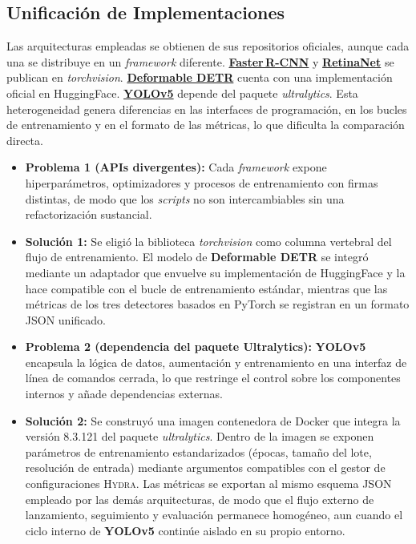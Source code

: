 \subsection{Unificación de Implementaciones}\label{ssec:unify_impl}

Las arquitecturas empleadas se obtienen de sus repositorios oficiales, aunque cada una se distribuye en un \emph{framework} diferente.
\href{https://docs.pytorch.org/vision/main/models/generated/torchvision.models.detection.fasterrcnn_resnet50_fpn_v2.html}{\textbf{Faster\,R-CNN}} y \href{https://docs.pytorch.org/vision/main/models/generated/torchvision.models.detection.retinanet_resnet50_fpn_v2.html}{\textbf{RetinaNet}} se publican en \emph{torchvision}.
\href{https://huggingface.co/SenseTime/deformable-detr}{\textbf{Deformable DETR}} cuenta con una implementación oficial en HuggingFace.
\href{https://docs.ultralytics.com/models/yolov5/}{\textbf{YOLOv5}} depende del paquete \textit{ultralytics}.
Esta heterogeneidad genera diferencias en las interfaces de programación, en los bucles de entrenamiento y en el formato de las métricas, lo que dificulta la comparación directa.

\begin{itemize}
  \item \textbf{Problema 1 (APIs divergentes):}
        Cada \emph{framework} expone hiperparámetros, optimizadores y procesos de entrenamiento con firmas distintas, de modo que los \emph{scripts} no son intercambiables sin una refactorización sustancial.

  \item \textbf{Solución 1:}
        Se eligió la biblioteca \textit{torchvision} como columna vertebral del flujo de entrenamiento.
        El modelo de \textbf{Deformable DETR} se integró mediante un adaptador que envuelve su implementación de HuggingFace y la hace compatible con el bucle de entrenamiento estándar, mientras que las métricas de los tres detectores basados en PyTorch se registran en un formato JSON unificado.

  \item \textbf{Problema 2 (dependencia del paquete Ultralytics):}
        \textbf{YOLOv5} encapsula la lógica de datos, aumentación y entrenamiento en una interfaz de línea de comandos cerrada, lo que restringe el control sobre los componentes internos y añade dependencias externas.

  \item \textbf{Solución 2:}
        Se construyó una imagen contenedora de Docker que integra la versión 8.3.121 del paquete \textit{ultralytics}.
        Dentro de la imagen se exponen parámetros de entrenamiento estandarizados (épocas, tamaño del lote, resolución de entrada) mediante argumentos compatibles con el gestor de configuraciones \textsc{Hydra}.
        Las métricas se exportan al mismo esquema JSON empleado por las demás arquitecturas, de modo que el flujo externo de lanzamiento, seguimiento y evaluación permanece homogéneo, aun cuando el ciclo interno de \textbf{YOLOv5} continúe aislado en su propio entorno.
\end{itemize}


